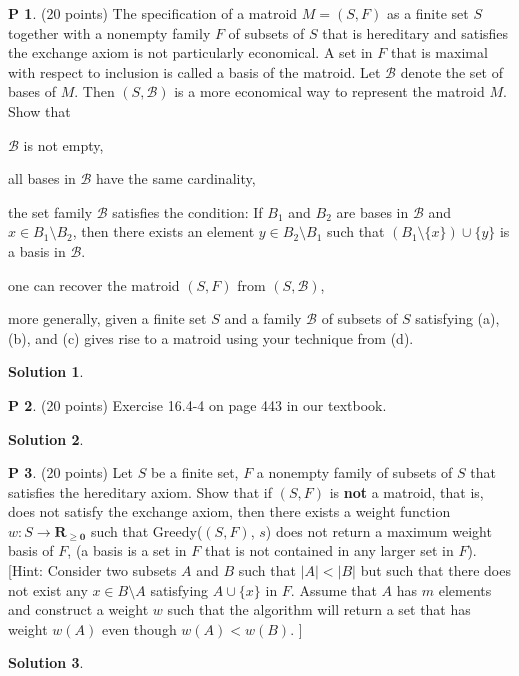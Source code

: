 \documentclass{article}
\theoremstyle{definition}
\newtheorem{problem}{P}
\newtheorem*{solution}{Solution}
\begin{document}
\begin{problem}(20 points) The specification of a matroid $M=(S,F)$ as
  a finite set $S$ together with a nonempty family $F$ of subsets of $S$ that
  is hereditary and satisfies the exchange axiom is not particularly
  economical. A set in $F$ that is maximal with respect to inclusion
  is called a basis of the matroid. Let $\mathcal{B}$ denote the set
  of bases of $M$. Then $(S,\mathcal{B})$ is a more economical
  way to represent the matroid $M$. Show that 
\begin{compactenum}[(a)]
\item $\mathcal{B}$ is not empty, 
\item all bases in $\mathcal{B}$ have the same cardinality,
\item the set family $\mathcal{B}$ satisfies the condition: If $B_1$
  and $B_2$ are bases in $\mathcal{B}$ and $x\in B_1\setminus B_2$,
  then there exists an element $y \in B_2\setminus B_1$ such that
  $(B_1\setminus \{x\} ) \cup \{y\}$ is a basis in $\mathcal{B}$. 
\item one can recover the matroid $(S,F)$ from $(S,\mathcal{B})$,
\item more generally, given a finite set $S$ and a family 
  $\mathcal{B}$ of subsets of $S$ satisfying (a), (b), and (c) gives
  rise to a matroid using your technique from (d). 
\end{compactenum}
\end{problem}
\begin{solution}
\end{solution}


\begin{problem}(20 points)
Exercise 16.4-4 on page 443 in our textbook. 
\end{problem}
\begin{solution}
\end{solution}

\begin{problem}(20 points)
  Let $S$ be a finite set, $F$ a nonempty family of subsets of $S$ that
  satisfies the hereditary axiom. Show that if $(S,F)$ is \textbf{not}
  a matroid, that is, does not satisfy the exchange axiom, then there
  exists a weight function $w\colon S \rightarrow \mathbf{R_{\ge 0}}$
  such that Greedy($(S,F)$, $s$) does not return a maximum weight
  basis of $F$, (a basis is a set in $F$ that is not contained in any
  larger set in $F$). [Hint: Consider two subsets $A$ and $B$ such
  that $|A|<|B|$ but such that there does not exist any $x\in
  B\setminus A$ satisfying $A\cup \{x\}$ in $F$. Assume that $A$ has
  $m$ elements and construct a weight $w$ such that the algorithm will
  return a set that has weight $w(A)$ even though $w(A)<w(B)$. ]
\end{problem}
\begin{solution}
\end{solution}
\end{document}
